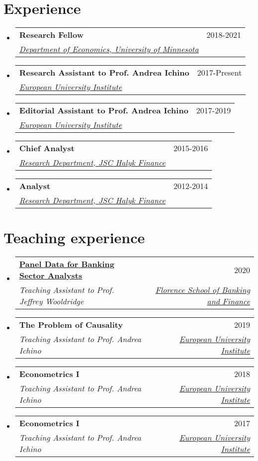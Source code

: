 \documentclass[a4, 11pt]{article}
\makeatletter
\newcommand{\resumeSubheading}[4]{
      \vspace{-2pt}\item
        \begin{tabular*}{0.97\textwidth}[t]{l@{\extracolsep{\fill}}r}
          \textbf{#1} & #2 \\
          \textit{\small#3} & \textit{\small #4} \\
        \end{tabular*}
    }
\newcommand{\resumeSubHeadingListStart}{\begin{itemize}[leftmargin=0.15in, label={}]}
\newcommand{\resumeSubHeadingListEnd}{\end{itemize}}
\makeatother
\begin{document}
    \section{Experience}
  \resumeSubHeadingListStart
        \resumeSubheading
          {Research Fellow}
          {2018-2021}
          {\href{https://cla.umn.edu/economics}{Department of Economics, University of Minnesota} }
          {}
        \resumeSubheading
          {Research Assistant to Prof. Andrea Ichino}
          {2017-Present}
          {\href{https://www.eui.eu}{European University Institute} }
          {}
        \resumeSubheading
          {Editorial Assistant to Prof. Andrea Ichino}
          {2017-2019}
          {\href{https://www.eui.eu}{European University Institute} }
          {}
        \resumeSubheading
          {Chief Analyst}
          {2015-2016}
          {\href{https://www.halykfinance.kz}{Research Department, JSC Halyk Finance} }
          {}
        \resumeSubheading
          {Analyst}
          {2012-2014}
          {\href{https://www.halykfinance.kz}{Research Department, JSC Halyk Finance} }
          {}
    \resumeSubHeadingListEnd


    \section{Teaching experience}
  \resumeSubHeadingListStart
        \resumeSubheading
          {\href{https://fbf.eui.eu/panel-data-for-banking-sector-analysts-2020/}{Panel Data for Banking Sector Analysts} }
          {2020}
          {Teaching Assistant to Prof. Jeffrey Wooldridge}
          { \href{https://www.fbf.eui.eu}{Florence School of Banking and Finance} }
        \resumeSubheading
          {{The Problem of Causality} }
          {2019}
          {Teaching Assistant to Prof. Andrea Ichino}
          { \href{https://www.eui.eu}{European University Institute} }
        \resumeSubheading
          {{Econometrics I} }
          {2018}
          {Teaching Assistant to Prof. Andrea Ichino}
          { \href{https://www.eui.eu}{European University Institute} }
        \resumeSubheading
          {{Econometrics I} }
          {2017}
          {Teaching Assistant to Prof. Andrea Ichino}
          { \href{https://www.eui.eu}{European University Institute} }
    \resumeSubHeadingListEnd


\end{document}
